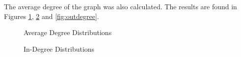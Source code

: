 The average degree of the graph was also calculated. The results are found in Figures \ref{fig:degree}, \ref{fig:indegree} and \ref{fig:outdegree}.

\begin{figure}[h!]
\centering
{}
\caption{Average Degree Distributions}
\label{fig:degree}
\end{figure}

\begin{figure}[h!]
\centering
{}
\caption{In-Degree Distributions}
\label{fig:indegree}
\end{figure}

